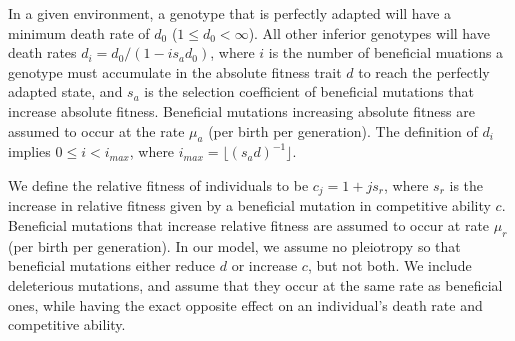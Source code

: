 \documentclass[9pt,twocolumn,twoside]{article}
\begin{document}
In a given environment, a genotype that is perfectly adapted will have a minimum death rate of $d_0$ ($1 \leq d_0 < \infty$). All other inferior genotypes will have death rates $d_i = d_0/(1-is_a d_0)$, where $i$ is the number of beneficial muations a genotype must accumulate in the absolute fitness trait $d$ to reach the perfectly adapted state, and $s_a$ is the selection coefficient of beneficial mutations that increase absolute fitness. Beneficial mutations increasing absolute fitness are assumed to occur at the rate $\mu_a$ (per birth per generation). The definition of $d_i$ implies $0 \leq i < i_{max}$, where $i_{max}  = \lfloor (s_a d)^{-1}\rfloor $. 

We define the relative fitness of individuals to be $c_j = 1+j s_r$, where $s_r$ is the increase in relative fitness given by a beneficial mutation in competitive ability $c$. Beneficial mutations that increase relative fitness are assumed to occur at rate $\mu_r$ (per birth per generation). In our model, we assume no pleiotropy so that beneficial mutations either reduce $d$ or increase $c$, but not both. We include deleterious mutations, and assume that they occur at the same rate as beneficial ones, while having the exact opposite effect on an individual's death rate and competitive ability. 
\end{document}
